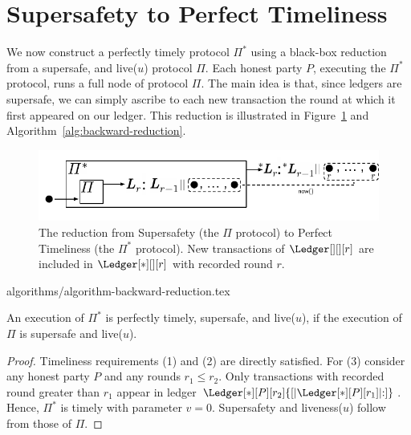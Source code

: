 \section{Supersafety to Perfect Timeliness}\label{sec:backward-reduction}

We now construct a perfectly timely protocol $\Pi^*$
using a black-box reduction from a supersafe, and live($u$) protocol $\Pi$.
Each honest party $P$, executing the $\Pi^*$ protocol, runs a
full node of protocol $\Pi$.
The main idea is that, since ledgers are supersafe, we can simply
ascribe to each new transaction the round at which it first appeared on our ledger.
This reduction is illustrated in Figure~\ref{fig:backward-reduction}
and Algorithm~\ref{alg:backward-reduction}.

\begin{figure}
  \centering
  \includegraphics[width=0.9\columnwidth,keepaspectratio]{figures/backward-reduction.pdf}
  \caption{The reduction from Supersafety
    (the $\Pi$ protocol) to Perfect Timeliness (the $\Pi^*$ protocol).
    New transactions of $\Ledger[][][r]$ are included in
    $\Ledger[*][][r]$ with recorded round $r$.
  }
 \label{fig:backward-reduction}
\end{figure}

{algorithms/algorithm-backward-reduction.tex}


\begin{theorem} \label{thm:backward-reduction}
  An execution of $\Pi^*$ is perfectly timely, supersafe, and live($u$), if the execution of
  $\Pi$ is supersafe and live($u$).
\end{theorem}
\begin{proof}
  Timeliness requirements (1) and (2) are directly satisfied.
  For (3) consider any honest party $P$ and any rounds $r_1 \leq r_2$.
  Only transactions with recorded round greater
  than $r_1$ appear in ledger $\Ledger[*][P][r_2]{[|\Ledger[*][P][r_1]|{:}]}$.
  Hence, $\Pi^*$ is timely with parameter $v = 0$.
  Supersafety and liveness($u$) follow from those of $\Pi$.
  \Qed
\end{proof}


